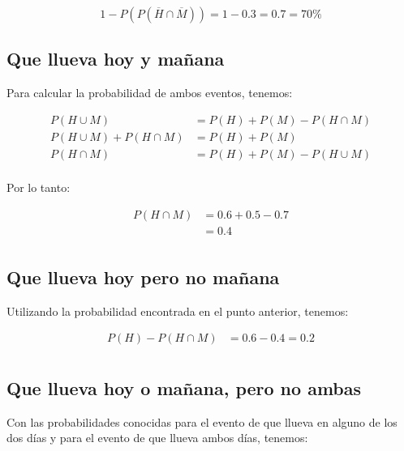 \documentclass[letterpaper,12pt]{memoir}
\theoremstyle{definition}
\begin{document}
\begin{equation*}
  1 - P(P(\overline{H} \cap \overline{M})) = 1 - 0.3 = 0.7 = 70\%
\end{equation*}

\subsection*{Que llueva hoy y mañana}

Para calcular la probabilidad de ambos eventos, tenemos:

\begin{equation*}
	\begin{split}
		P(H\cup M) &= P(H) + P(M) - P(H\cap M)\\
		P(H\cup M) + P(H\cap M) &= P(H) + P(M)\\
		P(H\cap M) &= P(H) + P(M) - P(H\cup M)\\
	\end{split}
\end{equation*}

Por lo tanto:

\begin{equation*}
  \begin{split}
  P(H\cap M) &= 0.6 + 0.5 - 0.7\\
  &= 0.4\\
  \end{split}
\end{equation*}

\subsection*{Que llueva hoy pero no mañana}

Utilizando la probabilidad encontrada en el punto anterior, tenemos:

\begin{equation*}
  \begin{split}
  P(H) - P(H\cap M) &= 0.6 - 0.4 = 0.2\\
  \end{split}
\end{equation*}

\subsection*{Que llueva hoy o mañana, pero no ambas}

Con las probabilidades conocidas para el evento de que llueva en alguno de los dos días y para el evento de que llueva ambos días, tenemos:
\end{document}
